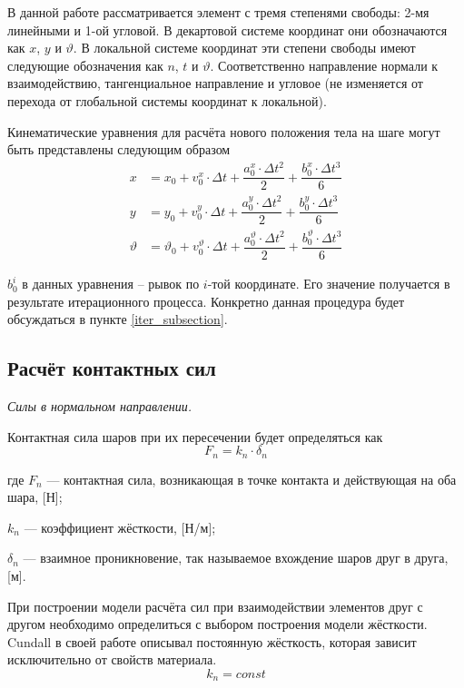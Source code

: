 \documentclass[a4paper]{article}
\begin{document}
В данной работе рассматривается элемент с тремя степенями свободы: 2-мя линейными и 1-ой угловой.
В декартовой системе координат они обозначаются как $x$, $y$ и $\vartheta$.
В локальной системе координат эти степени свободы имеют следующие обозначения как $n$, $t$ и $\vartheta$. Соответственно направление нормали к взаимодействию, тангенциальное направление и угловое (не изменяется от перехода от глобальной системы координат к локальной).

Кинематические уравнения для расчёта нового положения тела на шаге могут быть представлены следующим образом
\begin{align}
x &= x_0 + v^x_0 \cdot \Delta t + \dfrac{a^x_0 \cdot \Delta t^2}{2} + \dfrac{b^x_0 \cdot \Delta t^3}{6}\\
y &= y_0 + v^y_0 \cdot \Delta t + \dfrac{a^y_0 \cdot \Delta t^2}{2} + \dfrac{b^y_0 \cdot \Delta t^3}{6}\\
\vartheta &= \vartheta_0 + v^{\vartheta}_0 \cdot \Delta t + \dfrac{a^{\vartheta}_0 \cdot \Delta t^2}{2} + \dfrac{b^{\vartheta}_0 \cdot \Delta t^3}{6}
\end{align}

$b_0^i$ в данных уравнения -- рывок по $i$-той координате. 
Его значение получается в результате итерационного процесса.
Конкретно данная процедура будет обсуждаться в пункте \ref{iter_subsection}.



\subsection{Расчёт контактных сил}
\label{force_subsection}

\textit{Силы в нормальном направлении.}

Контактная сила шаров при их пересечении будет определяться как
\begin{equation}
\label{norm_force}
F_n = k_n \cdot \delta_n
\end{equation}

где $F_n$ --- контактная сила, возникающая в точке контакта и действующая на оба шара, [Н];

$k_n$ --- коэффициент жёсткости, [Н/м];

$\delta_n$ --- взаимное проникновение, так называемое вхождение шаров друг в друга, [м].

При построении модели расчёта сил при взаимодействии элементов друг с другом необходимо определиться с выбором построения модели жёсткости. 
Cundall в своей работе \cite{cundall} описывал постоянную жёсткость, которая зависит исключительно от свойств материала.
\begin{equation}
\label{kn_const}
k_n = const
\end{equation}
\end{document}
